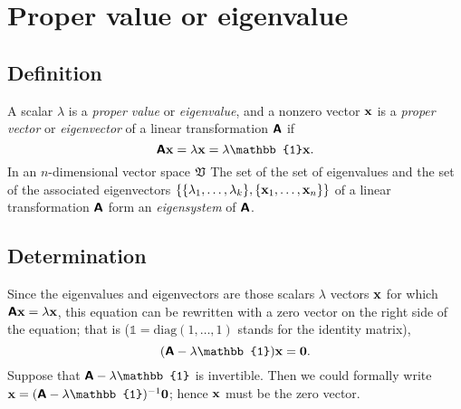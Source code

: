 \section{Proper value or eigenvalue}

\subsection{Definition}

A scalar $\lambda$ is a {\em proper value} or {\em eigenvalue},
and a nonzero vector ${\bf x}$ is a {\em proper vector} or {\em eigenvector}
of a linear transformation $\textsf{\textbf{A}}$
if
\begin{equation}
\textsf{\textbf{A}}{\bf x}=   \lambda {\bf x} =   \lambda \mathbb{1} {\bf x}.
\end{equation}
In an $n$-dimensional
vector space $\frak V$
The set of the set of eigenvalues and the set of the associated eigenvectors
$\{\{\lambda_1,\ldots ,\lambda_k\},\{{\bf x}_1,\ldots ,{\bf x}_n\}\}$
of a linear transformation $\textsf{\textbf{A}}$ form an {\em eigensystem} of $\textsf{\textbf{A}}$.

\subsection{Determination}



Since the eigenvalues and eigenvectors are those scalars $\lambda$  vectors ${\bf x}$ for which $\textsf{\textbf{A}}{\bf x}=   \lambda {\bf x}$,
this equation can be rewritten with a zero vector on the right side of the equation; that is ($\mathbb{1}=\textrm{diag}(1,\ldots ,1)$ stands for the identity matrix),
\begin{equation}
(\textsf{\textbf{A}} - \lambda \mathbb{1}){\bf x}= {\bf 0}.
\label{2011-m-eve}
\end{equation}
Suppose that $\textsf{\textbf{A}} - \lambda \mathbb{1}$ is invertible. Then we could formally write
${\bf x} = (\textsf{\textbf{A}} - \lambda \mathbb{1})^{-1}{\bf 0}$; hence ${\bf x}$ must be the zero vector.

